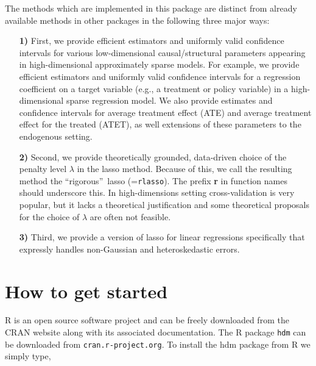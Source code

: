 \documentclass{amsart}\usepackage[]{graphicx}\usepackage[]{color}
\newcommand{\Rpackage}[1]{{\texttt{#1}}}
\newcommand{\R}{{\normalfont\textsf{R }}{}}
\newcommand{\code}[1]{\texttt{#1}}
\begin{document}
The methods which are implemented in this package are distinct from already available methods in other packages in the following three major ways: 
\begin{itemize} 


\item[\textbf{1)}] First, we provide efficient estimators and  uniformly valid confidence intervals for various low-dimensional causal/structural parameters  appearing in high-dimensional approximately sparse models.   For example, we provide efficient estimators and uniformly valid confidence intervals for a regression coefficient on a target variable (e.g., a treatment or policy variable) in a high-dimensional sparse regression model.  We also provide estimates and confidence intervals for average treatment effect (ATE) and average treatment effect for the treated (ATET),  as well  extensions of these parameters to the endogenous setting.


\item[\textbf{2)}] Second, we provide theoretically grounded, data-driven choice of the penalty level $\lambda$ in the lasso 
method. Because of this, we call the resulting method the \textquotedblleft rigorous\textquotedblright\ lasso (=\code{rlasso}). The prefix \textbf{r} in function names should underscore this. In high-dimensions setting cross-validation is very popular, but it lacks a theoretical justification and some theoretical proposals for the choice of $\lambda$ are often not feasible.

\item[\textbf{3)}] Third, we provide a version of lasso for linear regressions specifically that expressly handles non-Gaussian and heteroskedastic errors.

\end{itemize}




\section{How to get started}
\R is an open source software project and can be freely downloaded from the CRAN
website along with its associated documentation. The \R package \Rpackage{hdm} can be downloaded from \texttt{cran.r-project.org}. To install the hdm package from \R we simply type,
\end{document}
